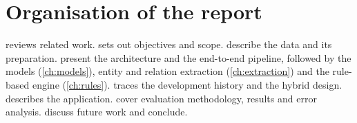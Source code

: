 \section{Organisation of the report}
 reviews related work.  sets out objectives and scope.  describe the data and its preparation.  present the architecture and the end-to-end pipeline, followed by the models (\cref{ch:models}), entity and relation extraction (\cref{ch:extraction}) and the rule-based engine (\cref{ch:rules}).  traces the development history and the hybrid design.  describes the application.  cover evaluation methodology, results and error analysis.  discuss future work and conclude.
